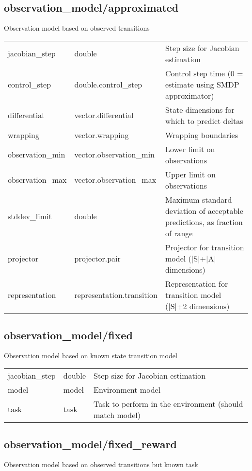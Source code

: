 \subsection{observation\_model/approximated}
\noindent Observation model based on observed transitions\\

\noindent\begin{tabular}{@{}lll@{}}
jacobian\_step&double&Step size for Jacobian estimation\\
control\_step&double.control\_step&Control step time (0 = estimate using SMDP approximator)\\
differential&vector.differential&State dimensions for which to predict deltas\\
wrapping&vector.wrapping&Wrapping boundaries\\
observation\_min&vector.observation\_min&Lower limit on observations\\
observation\_max&vector.observation\_max&Upper limit on observations\\
stddev\_limit&double&Maximum standard deviation of acceptable predictions, as fraction of range\\
projector&projector.pair&Projector for transition model (|S|+|A| dimensions)\\
representation&representation.transition&Representation for transition model (|S|+2 dimensions)\\
\end{tabular}
\subsection{observation\_model/fixed}
\noindent Observation model based on known state transition model\\

\noindent\begin{tabular}{@{}lll@{}}
jacobian\_step&double&Step size for Jacobian estimation\\
model&model&Environment model\\
task&task&Task to perform in the environment (should match model)\\
\end{tabular}
\subsection{observation\_model/fixed\_reward}
\noindent Observation model based on observed transitions but known task\\

